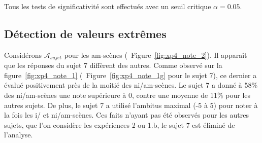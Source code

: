 Tous les tests de significativité sont effectués avec un seuil critique $\alpha=0.05$.

\subsection{Détection de valeurs extrêmes}

Considérons $\mathcal{A}_{sujet}$ pour les am-scènes (\cf~Figure~\ref{fig:xp4_note_2}). Il apparaît que les réponses du sujet 7 diffèrent des autres. Comme observé sur la figure~\ref{fig:xp4_note_1} (\cf~Figure~\ref{fig:xp4_note_1g} pour le sujet 7), ce dernier a évalué positivement près de la moitié des ni/am-scènes. Le sujet 7 a donné à 58\% des ni/am-scènes une note supérieure à 0, contre une moyenne de 11\% pour les autres sujets. De plus, le sujet 7 a utilisé l'ambitus maximal (-5 à 5) pour noter à la fois les i/ et ni/am-scènes. Ces faits n'ayant pas été observés pour les autres sujets, que l'on considère les expériences 2 ou 1.b, le sujet 7 est éliminé de l'analyse. 

